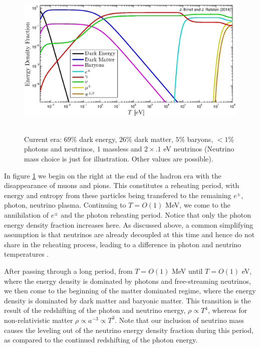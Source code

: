 \begin{figure}
\centerline{\hspace*{0.4cm}\includegraphics[height=7.6cm]{03-birrell/ErasOfUniverse/energy_densities_total.eps}}\label{fig:energy_frac}
\caption{Current era: $69\%$ dark energy, $26\%$ dark matter, $5\%$ baryons, $<1\%$ photons and neutrinos, $1$ massless and $2\times .1$ eV neutrinos (Neutrino mass choice is just for illustration.  Other values are possible).}
 \end{figure}
In figure \ref{fig:energy_frac} we begin on the right at the end of the hadron era with the disappearance of muons and pions.  This constitutes a reheating period, with energy and entropy from these particles being transfered to the remaining $e^\pm$, photon, neutrino plasma.  Continuing to $T=O(1)$ MeV, we come to the annihilation  of $e^\pm$ and the photon reheating period.  Notice that only the photon energy density fraction increases here.  As discussed above, a common simplifying assumption is that neutrinos are already decoupled at this time and hence do not share in the reheating process, leading to a difference in photon and neutrino temperatures .

After passing through a long period, from $T=O(1)$ MeV until $T=O(1)$ eV, where the energy density is dominated by photons and free-streaming neutrinos, we then come to the beginning of the matter dominated regime, where the energy density is dominated by dark matter and baryonic matter.  This transition is the result of the redshifting of the photon and neutrino energy, $\rho\propto T^4$, whereas for non-relativistic matter $\rho\propto a^{-3}\propto T^3$.  Note that our inclusion of neutrino mass causes the leveling out of the neutrino energy density fraction during this period, as compared to the continued redshifting of the photon energy.


